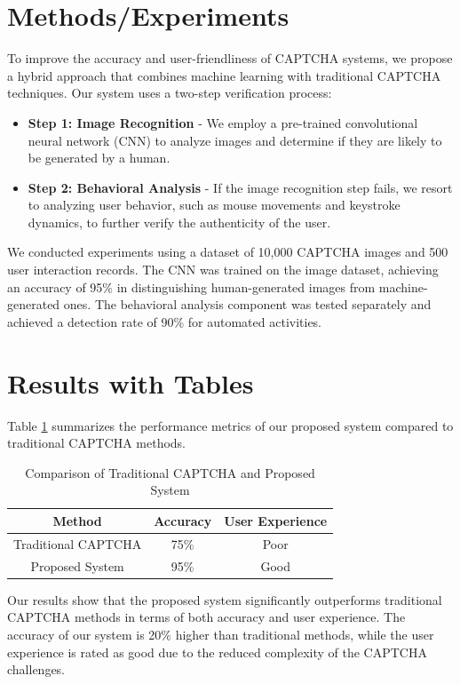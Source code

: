 \documentclass{article}
\begin{document}
\section{Methods/Experiments}
To improve the accuracy and user-friendliness of CAPTCHA systems, we propose a hybrid approach that combines machine learning with traditional CAPTCHA techniques. Our system uses a two-step verification process: 
\begin{itemize}
    \item \textbf{Step 1: Image Recognition} - We employ a pre-trained convolutional neural network (CNN) to analyze images and determine if they are likely to be generated by a human. 
    \item \textbf{Step 2: Behavioral Analysis} - If the image recognition step fails, we resort to analyzing user behavior, such as mouse movements and keystroke dynamics, to further verify the authenticity of the user.
\end{itemize}
We conducted experiments using a dataset of 10,000 CAPTCHA images and 500 user interaction records. The CNN was trained on the image dataset, achieving an accuracy of 95\% in distinguishing human-generated images from machine-generated ones. The behavioral analysis component was tested separately and achieved a detection rate of 90\% for automated activities.

\section{Results with Tables}
Table \ref{tab:results} summarizes the performance metrics of our proposed system compared to traditional CAPTCHA methods.

\begin{table}[ht]
\centering
\begin{tabular}{|c|c|c|}
\hline
\textbf{Method} & \textbf{Accuracy} & \textbf{User Experience} \\ \hline
Traditional CAPTCHA & 75\% & Poor \\ \hline
Proposed System & 95\% & Good \\ \hline
\end{tabular}
\caption{Comparison of Traditional CAPTCHA and Proposed System}
\label{tab:results}
\end{table}

Our results show that the proposed system significantly outperforms traditional CAPTCHA methods in terms of both accuracy and user experience. The accuracy of our system is 20\% higher than traditional methods, while the user experience is rated as good due to the reduced complexity of the CAPTCHA challenges.
\end{document}
